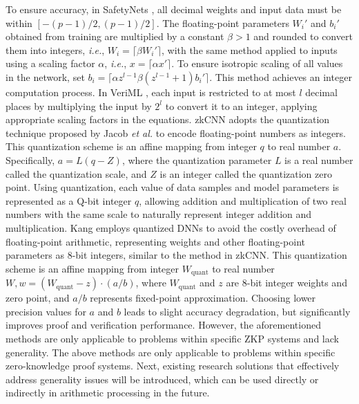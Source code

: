 \documentclass[journal]{IEEEtran}
\begin{document}
To ensure accuracy, in SafetyNets \cite{ghodsi2017safetynets}, all decimal weights and input data must be within \([- (p - 1)/2, (p - 1)/2]\). The floating-point parameters \(W_i'\) and \(b_i'\) obtained from training are multiplied by a constant \(\beta > 1\) and rounded to convert them into integers, \emph{i.e.}, \(W_i = \lceil \beta W_i' \rceil\), with the same method applied to inputs using a scaling factor \(\alpha\), \emph{i.e.}, \(x = \lceil \alpha x' \rceil\). To ensure isotropic scaling of all values in the network, set \(b_i = \lceil \alpha z^{l-1} \beta (z^{l-1}+1) b_i' \rceil\). This method achieves an integer computation process. In VeriML \cite{zhao2021veriml}, each input is restricted to at most \(l\) decimal places by multiplying the input by \(2^l\) to convert it to an integer, applying appropriate scaling factors in the equations. zkCNN \cite{liu2021zkcnn} adopts the quantization technique proposed by Jacob \emph{et al.} \cite{Jacob_2018_CVPR} to encode floating-point numbers as integers. This quantization scheme is an affine mapping from integer \(q\) to real number \(a\). Specifically, \(a = L(q - Z)\), where the quantization parameter \(L\) is a real number called the quantization scale, and \(Z\) is an integer called the quantization zero point. Using quantization, each value of data samples and model parameters is represented as a Q-bit integer \(q\), allowing addition and multiplication of two real numbers with the same scale to naturally represent integer addition and multiplication. Kang \cite{kang2022scaling} employs quantized DNNs to avoid the costly overhead of floating-point arithmetic, representing weights and other floating-point parameters as 8-bit integers, similar to the method in zkCNN. This quantization scheme is an affine mapping from integer \(W_{\text{quant}}\) to real number \(W, w = (W_{\text{quant}} - z) \cdot (a/b)\), where \(W_{\text{quant}}\) and \(z\) are 8-bit integer weights and zero point, and \(a/b\) represents fixed-point approximation. Choosing lower precision values for \(a\) and \(b\) leads to slight accuracy degradation, but significantly improves proof and verification performance. However, the aforementioned methods are only applicable to problems within specific ZKP systems and lack generality. The above methods are only applicable to problems within specific zero-knowledge proof systems. Next, existing research solutions that effectively address generality issues will be introduced, which can be used directly or indirectly in arithmetic processing in the future.
\end{document}
